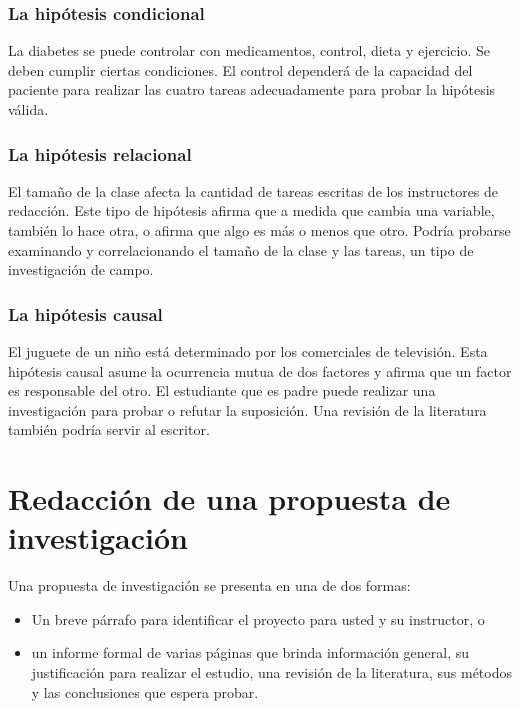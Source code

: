 \subsubsection{La hipótesis condicional}
La diabetes se puede controlar con medicamentos, control, dieta y ejercicio. Se deben cumplir ciertas condiciones. El control dependerá de la capacidad del paciente para realizar las cuatro tareas adecuadamente para probar la hipótesis válida.

\subsubsection{La hipótesis relacional}
El tamaño de la clase afecta la cantidad de tareas escritas de los instructores de redacción. Este tipo de hipótesis afirma que a medida que cambia una variable, también lo hace otra, o afirma que algo es más o menos que otro. Podría probarse examinando y correlacionando el tamaño de la clase y las tareas, un tipo de investigación de campo.

\subsubsection{La hipótesis causal}
El juguete de un niño está determinado por los comerciales de televisión. Esta hipótesis causal asume la ocurrencia mutua de dos factores y afirma que un factor es responsable del otro. El estudiante que es padre puede realizar una investigación para probar o refutar la suposición. Una revisión de la literatura también podría servir al escritor.

\section{Redacción de una propuesta de investigación}
Una propuesta de investigación se presenta en una de dos formas:
\begin{itemize}
    \item Un breve párrafo para identificar el proyecto para usted y su instructor, o 
    \item un informe formal de varias páginas que brinda información general, su justificación para realizar el estudio, una revisión de la literatura, sus métodos y las conclusiones que espera probar.
\end{itemize}

